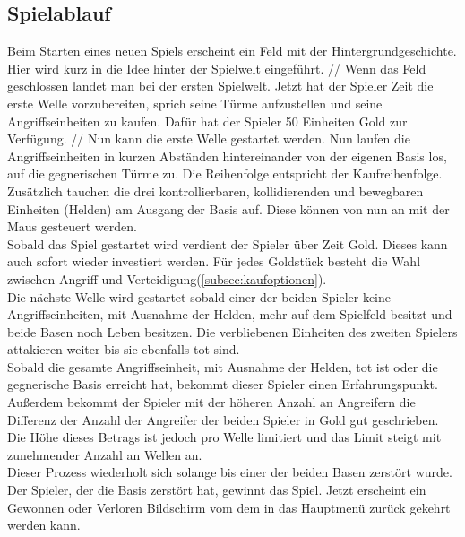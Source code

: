 \subsection{Spielablauf}
Beim Starten eines neuen Spiels erscheint ein Feld mit der
Hintergrundgeschichte. Hier wird kurz in die Idee hinter der Spielwelt
eingeführt. //
Wenn das Feld geschlossen landet man bei der ersten Spielwelt. Jetzt hat der 
Spieler Zeit die erste Welle vorzubereiten, sprich seine Türme aufzustellen 
und seine Angriffseinheiten zu kaufen. Dafür hat der Spieler 50 Einheiten Gold
zur Verfügung. //
Nun kann die erste Welle gestartet werden.
Nun laufen die Angriffseinheiten in kurzen Abständen hintereinander von der
eigenen Basis los, auf die gegnerischen Türme zu. Die Reihenfolge entspricht
der Kaufreihenfolge. Zusätzlich tauchen die drei kontrollierbaren,
kollidierenden und bewegbaren Einheiten (Helden) am Ausgang der Basis auf. Diese
können von nun an mit der Maus gesteuert werden. \\
Sobald das Spiel gestartet wird verdient der Spieler über Zeit Gold. Dieses
kann auch sofort wieder investiert werden. Für jedes Goldstück besteht die
Wahl zwischen Angriff und Verteidigung(\ref{subsec:kaufoptionen}). \\

Die nächste Welle wird gestartet sobald einer der beiden Spieler keine 
Angriffseinheiten, mit Ausnahme der Helden, mehr auf dem Spielfeld besitzt
und beide Basen noch Leben besitzen. Die verbliebenen Einheiten des zweiten 
Spielers attakieren weiter bis sie ebenfalls tot sind. \\
Sobald die gesamte Angriffseinheit, mit Ausnahme der Helden, tot ist oder die 
gegnerische Basis erreicht hat, bekommt dieser Spieler einen Erfahrungspunkt. 
Außerdem bekommt der Spieler mit der höheren Anzahl an Angreifern die 
Differenz der Anzahl der Angreifer der beiden Spieler in Gold gut geschrieben.
Die Höhe dieses Betrags ist jedoch pro Welle limitiert und das Limit steigt 
mit zunehmender Anzahl an Wellen an.\\

Dieser Prozess wiederholt sich solange bis einer der beiden Basen zerstört 
wurde. Der Spieler, der die Basis zerstört hat, gewinnt das Spiel. 
Jetzt erscheint ein Gewonnen oder Verloren Bildschirm vom dem in das Hauptmenü
zurück gekehrt werden kann.
